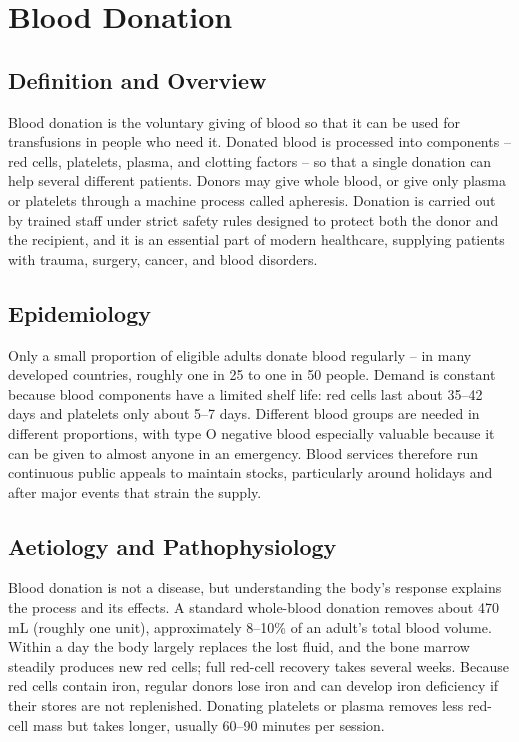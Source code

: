 \chapter{Blood Donation}

\section*{Definition and Overview}
Blood donation is the voluntary giving of blood so that it can be used for transfusions in people who need it. Donated blood is processed into components -- red cells, platelets, plasma, and clotting factors -- so that a single donation can help several different patients. Donors may give whole blood, or give only plasma or platelets through a machine process called apheresis. Donation is carried out by trained staff under strict safety rules designed to protect both the donor and the recipient, and it is an essential part of modern healthcare, supplying patients with trauma, surgery, cancer, and blood disorders.

\section*{Epidemiology}
Only a small proportion of eligible adults donate blood regularly -- in many developed countries, roughly one in 25 to one in 50 people. Demand is constant because blood components have a limited shelf life: red cells last about 35--42 days and platelets only about 5--7 days. Different blood groups are needed in different proportions, with type O negative blood especially valuable because it can be given to almost anyone in an emergency. Blood services therefore run continuous public appeals to maintain stocks, particularly around holidays and after major events that strain the supply.

\section*{Aetiology and Pathophysiology}
Blood donation is not a disease, but understanding the body's response explains the process and its effects. A standard whole-blood donation removes about 470 mL (roughly one unit), approximately 8--10\% of an adult's total blood volume. Within a day the body largely replaces the lost fluid, and the bone marrow steadily produces new red cells; full red-cell recovery takes several weeks. Because red cells contain iron, regular donors lose iron and can develop iron deficiency if their stores are not replenished. Donating platelets or plasma removes less red-cell mass but takes longer, usually 60--90 minutes per session.


